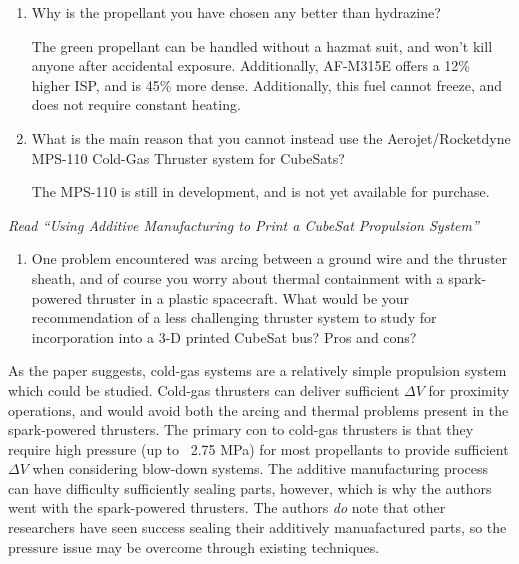 \documentclass[onecolumn,10pt]{jhwhw}
\begin{document}
\begin{enumerate}
\item Why is the propellant you have chosen any better than hydrazine?

The green propellant can be handled without a hazmat suit, and won't kill anyone after accidental exposure. Additionally, AF-M315E offers a 12\% higher ISP, and is 45\% more dense. Additionally, this fuel cannot freeze, and does not require constant heating.

\item What is the main reason that you cannot instead use the Aerojet/Rocketdyne MPS-110 Cold-Gas Thruster system for CubeSats?

The MPS-110 is still in development, and is not yet available for purchase.

\end{enumerate}

\problem{}
\textit{Read ``Using Additive Manufacturing to Print a CubeSat Propulsion System''}
\begin{enumerate}
\item One problem encountered was arcing between a ground wire and the thruster sheath, and of course you worry about thermal containment with a spark-powered thruster in a plastic spacecraft. What would be your recommendation of a less challenging thruster system to study for incorporation into a 3-D printed CubeSat bus? Pros and cons?
\end{enumerate}

As the paper suggests, cold-gas systems are a relatively simple propulsion system which could be studied. Cold-gas thrusters can deliver sufficient $\Delta V$ for proximity operations, and would avoid both the arcing and thermal problems present in the spark-powered thrusters. The primary con to cold-gas thrusters is that they require high pressure (up to ~2.75 MPa) for most propellants to provide sufficient $\Delta V$ when considering blow-down systems. The additive manufacturing process can have difficulty sufficiently sealing parts, however, which is why the authors went with the spark-powered thrusters. The authors \textit{do} note that other researchers have seen success sealing their additively manuafactured parts, so the pressure issue may be overcome through existing techniques.
\end{document}
